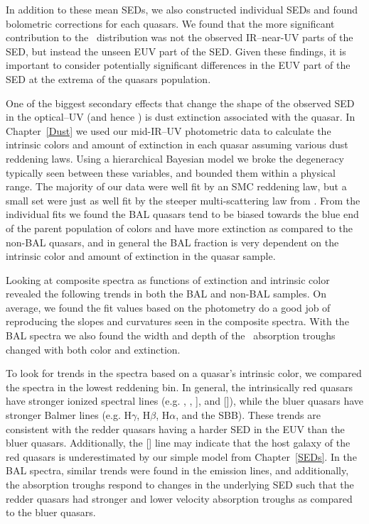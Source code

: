 In addition to these mean SEDs, we also constructed individual SEDs and found bolometric corrections for each quasars.  We found that the more significant contribution to the \bctwofive\ distribution was not the observed IR--near-UV parts of the SED, but instead the unseen EUV part of the SED.  Given these findings, it is important to consider potentially significant differences in the EUV part of the SED at the extrema of the quasars population.

One of the biggest secondary effects that change the shape of the observed SED in the optical--UV (and hence \lbol) is dust extinction associated with the quasar.  In Chapter~\ref{Dust} we used our mid-IR--UV photometric data to calculate the intrinsic colors and amount of extinction in each quasar assuming various dust reddening laws.  Using a hierarchical Bayesian model we broke the degeneracy typically seen between these variables, and bounded them within a physical range.  The majority of our data were well fit by an SMC reddening law, but a small set were just as well fit by the steeper multi-scattering law from \citet{Leighly:2014}.  From the individual fits we found the BAL quasars tend to be biased towards the blue end of the parent population of colors and have more extinction as compared to the non-BAL quasars,
and in general the BAL fraction is very dependent on the intrinsic color and amount of extinction in the quasar sample.

Looking at composite spectra as functions of extinction and intrinsic color revealed the following trends in both the BAL and non-BAL samples.  On average, we found the fit values based on the photometry do a good job of reproducing the slopes and curvatures seen in the composite spectra.  With the BAL spectra we also found the width and depth of the \civ\ absorption troughs changed with both color and extinction.

To look for trends in the spectra based on a quasar's intrinsic color, we compared the spectra in the lowest reddening bin.  In general, the intrinsically red quasars have stronger ionized spectral lines (e.g. , , ], and []), while the bluer quasars have stronger Balmer lines (e.g. H$\gamma$, H$\beta$, H$\alpha$, and the SBB).  These trends are consistent with the redder quasars having a harder SED in the EUV than the bluer quasars.  Additionally, the [] line may indicate that the host galaxy of the red quasars is underestimated by our simple model from Chapter~\ref{SEDs}.  In the BAL spectra, similar trends were found in the emission lines, and additionally, the absorption troughs respond to changes in the underlying SED such that the redder quasars had stronger and lower velocity absorption troughs as compared to the bluer quasars.

